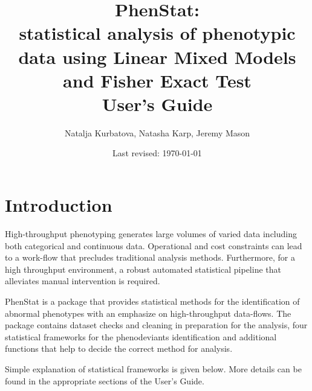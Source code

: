 \documentclass[12pt,a4paper]{article}
\title{\textbf{PhenStat}: \\ statistical analysis of phenotypic data using Linear Mixed Models and Fisher Exact Test\\ \textbf{User's Guide}}
\author{Natalja Kurbatova, Natasha Karp, Jeremy Mason}
\date{Last revised: \today}
\begin{document}
\maketitle
\newpage
\tableofcontents
\newpage
\section{Introduction}
High-throughput phenotyping generates large volumes of varied data including both categorical and continuous data. Operational and cost constraints can lead to a work-flow that precludes traditional analysis methods. Furthermore, for a high throughput environment, a robust automated statistical pipeline that alleviates manual intervention is required. 

PhenStat is a package that provides statistical methods for the identification of abnormal phenotypes with an emphasize on high-throughput data-flows. The package contains dataset checks and cleaning in preparation for the analysis, four statistical frameworks for the phenodeviants identification and additional functions that help to decide the correct method for analysis. 

Simple explanation of statistical frameworks is given below. More details can be found in the appropriate sections of the User's Guide. 
\end{document}
